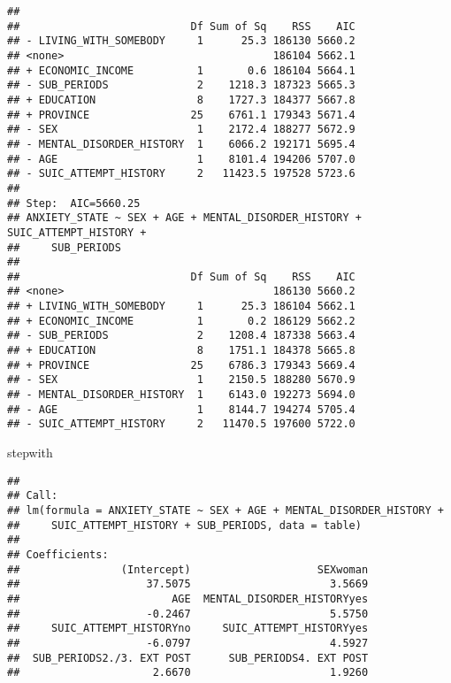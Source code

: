 \documentclass[
]{book}
\newenvironment{Shaded}{\begin{snugshade}}{\end{snugshade}}
\newcommand{\CommentTok}[1]{\textcolor[rgb]{0.56,0.35,0.01}{\textit{#1}}}
\newcommand{\NormalTok}[1]{#1}
\newcommand{\SpecialCharTok}[1]{\textcolor[rgb]{0.00,0.00,0.00}{#1}}
\begin{document}
\begin{verbatim}
## 
##                           Df Sum of Sq    RSS    AIC
## - LIVING_WITH_SOMEBODY     1      25.3 186130 5660.2
## <none>                                 186104 5662.1
## + ECONOMIC_INCOME          1       0.6 186104 5664.1
## - SUB_PERIODS              2    1218.3 187323 5665.3
## + EDUCATION                8    1727.3 184377 5667.8
## + PROVINCE                25    6761.1 179343 5671.4
## - SEX                      1    2172.4 188277 5672.9
## - MENTAL_DISORDER_HISTORY  1    6066.2 192171 5695.4
## - AGE                      1    8101.4 194206 5707.0
## - SUIC_ATTEMPT_HISTORY     2   11423.5 197528 5723.6
## 
## Step:  AIC=5660.25
## ANXIETY_STATE ~ SEX + AGE + MENTAL_DISORDER_HISTORY + SUIC_ATTEMPT_HISTORY + 
##     SUB_PERIODS
## 
##                           Df Sum of Sq    RSS    AIC
## <none>                                 186130 5660.2
## + LIVING_WITH_SOMEBODY     1      25.3 186104 5662.1
## + ECONOMIC_INCOME          1       0.2 186129 5662.2
## - SUB_PERIODS              2    1208.4 187338 5663.4
## + EDUCATION                8    1751.1 184378 5665.8
## + PROVINCE                25    6786.3 179343 5669.4
## - SEX                      1    2150.5 188280 5670.9
## - MENTAL_DISORDER_HISTORY  1    6143.0 192273 5694.0
## - AGE                      1    8144.7 194274 5705.4
## - SUIC_ATTEMPT_HISTORY     2   11470.5 197600 5722.0
\end{verbatim}

\begin{Shaded}
\begin{Highlighting}[]
\NormalTok{stepwith}
\end{Highlighting}
\end{Shaded}

\begin{verbatim}
## 
## Call:
## lm(formula = ANXIETY_STATE ~ SEX + AGE + MENTAL_DISORDER_HISTORY + 
##     SUIC_ATTEMPT_HISTORY + SUB_PERIODS, data = table)
## 
## Coefficients:
##                (Intercept)                    SEXwoman  
##                    37.5075                      3.5669  
##                        AGE  MENTAL_DISORDER_HISTORYyes  
##                    -0.2467                      5.5750  
##     SUIC_ATTEMPT_HISTORYno     SUIC_ATTEMPT_HISTORYyes  
##                    -6.0797                      4.5927  
##  SUB_PERIODS2./3. EXT POST      SUB_PERIODS4. EXT POST  
##                     2.6670                      1.9260
\end{verbatim}

\begin{Shaded}
\end{Shaded}
\end{document}
